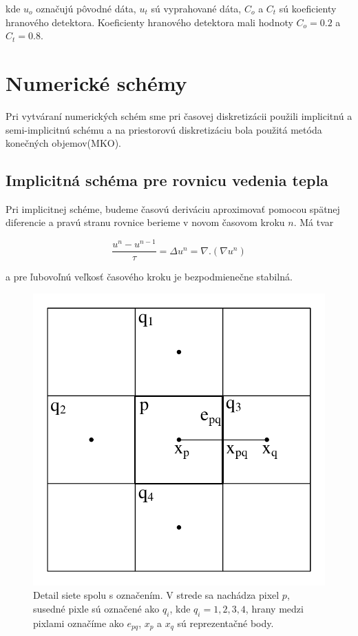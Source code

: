 \documentclass[a4paper,11pt,oneside]{article}%
\begin{document}
kde $u_o$ označujú pôvodné dáta, $u_t$ sú vyprahované dáta, $C_o$ a $C_t$ sú koeficienty hranového detektora. Koeficienty hranového detektora mali hodnoty $C_o = 0.2$ a $C_t = 0.8$.


\newpage
\section{Numerické schémy}

Pri vytváraní numerických schém\cite{skripta} sme pri časovej diskretizácii použili implicitnú a semi-implicitnú schému a na priestorovú diskretizáciu bola použitá metóda konečných objemov(MKO).

\subsection{Implicitná schéma pre rovnicu vedenia tepla}

Pri implicitnej schéme, budeme časovú deriváciu aproximovať pomocou spätnej diferencie a pravú stranu rovnice berieme v novom časovom kroku $n$. Má tvar

\begin{equation} \label{eq:ihe}
\frac{u^n - u^{n-1}}{\tau} = \Delta u^n = \nabla . (\nabla u^n)
\end{equation}

a pre ľubovoľnú veľkosť časového kroku je bezpodmienečne stabilná. 

\begin{figure}[h!]
 \begin{center} 
 \includegraphics[scale=0.40]{pics/hrany1.pdf}
\caption{Detail siete spolu s označením. V strede sa nachádza pixel $p$, susedné pixle sú označené ako $q_i$, kde $q_i = 1, 2, 3, 4$, hrany medzi pixlami označíme ako $e_{pq}$, $x_p$ a $x_q$ sú reprezentačné body. }
\label{fig:hrany}
\end{center} 
\end{figure}
\end{document}
